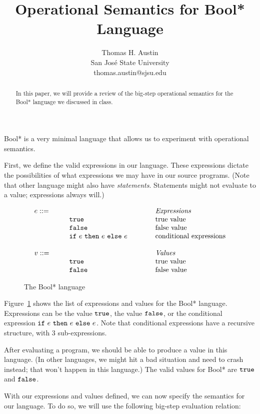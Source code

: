 \documentclass{article}
\author{
  Thomas H. Austin \\
  San Jos\'{e} State University \\
  thomas.austin@sjsu.edu
  }
\newcommand{\mydefhead}[2]{\multicolumn{2}{l}{{#1}}&\mbox{\emph{#2}}\\}
\newcommand{\mydefcase}[2]{\qquad\qquad& #1 &\mbox{#2}\\}
\newcommand{\true}{\mbox{\tt true}}
\newcommand{\false}{\mbox{\tt false}}\title{Operational Semantics for Bool* Language}
\newcommand{\ife}[3]{\mbox{\tt if}~{#1}~\mbox{\tt then}~{#2}~\mbox{\tt else}~{#3}}
\begin{document}
\maketitle

\begin{abstract}
In this paper, we will provide a review of the big-step operational semantics
for the Bool* language we discussed in class.
\end{abstract}


Bool* is a very minimal language that allows us to experiment with operational semantics.

First, we define the valid expressions in our language.
These expressions dictate the possibilities of what expressions
we may have in our source programs.
(Note that other language might also have {\em statements}.
Statements might not evaluate to a value;
expressions always will.)

\begin{figure}
\caption{The Bool* language}
\label{fig:lang}
\[
  \begin{array}{ll@{\qquad\qquad}l}
  \mydefhead{e ::=\qquad\qquad\qquad\qquad}{Expressions}
  \mydefcase{\true}{true value}
  \mydefcase{\false}{false value}
  \mydefcase{\ife e e e}{conditional expressions}
  \\
  \mydefhead{v ::=\qquad\qquad\qquad\qquad}{Values}
  \mydefcase{\true}{true value}
  \mydefcase{\false}{false value}
\end{array}
\]
\end{figure}

Figure~\ref{fig:lang} shows the list of expressions and values for the Bool* language.
Expressions can be the value $\true$, the value $\false$,
or the conditional expression $\ife e e e$.
Note that conditional expressions have a recursive structure,
with 3 sub-expressions.

After evaluating a program, we should be able to produce a value in this language.
(In other languages, we might hit a bad situation and need to crash instead;
that won't happen in this language.)
The valid values for Bool* are $\true$ and $\false$.

With our expressions and values defined,
we can now specify the semantics for our language.
To do so, we will use the following big-step evaluation relation:
\end{document}
